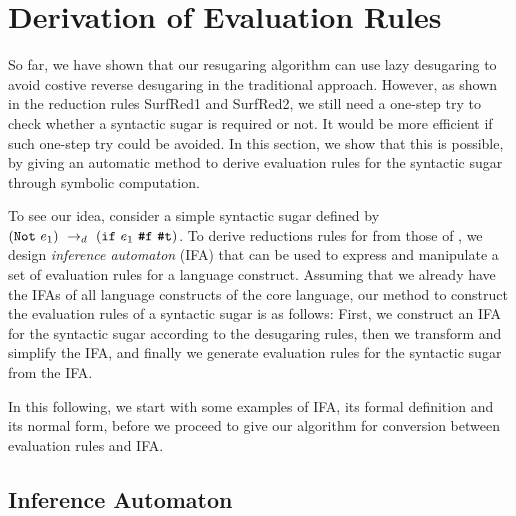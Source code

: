 \section{Derivation of Evaluation Rules}
\label{sec:ruleDerivation}

So far, we have shown that our resugaring algorithm can use lazy desugaring to avoid costive reverse desugaring in the traditional approach. However, as shown in the reduction rules {\sc SurfRed1} and {\sc SurfRed2}, we still need a one-step try to check whether a syntactic sugar is required or not. It would be more efficient if such one-step try could be avoided. In this section, we show that this is possible, by giving an automatic method to derive evaluation rules for the syntactic sugar through symbolic computation.


To see our idea, consider a simple syntactic sugar defined by $(\mbox{\tt Not}~e_1) ~\rightarrow_d~ (\mbox{\tt if}~e_1~\mbox{\tt \#f}~\mbox{\tt \#t})$. To derive reductions rules for  from those of , we design \textit{inference automaton} (IFA) that can be used to express and manipulate a set of evaluation rules for a language construct.
%
Assuming that we already have the IFAs of all language constructs of the core language, our method to construct the evaluation rules of a syntactic sugar is as follows: First, we construct an IFA for the syntactic sugar according to the desugaring rules, then we transform and simplify the IFA, and finally we generate evaluation rules for the syntactic sugar from the IFA.

In this following, we start with some examples of IFA, its formal definition and its normal form, before we proceed to give our algorithm for conversion between evaluation rules and IFA.

\subsection{Inference Automaton}

